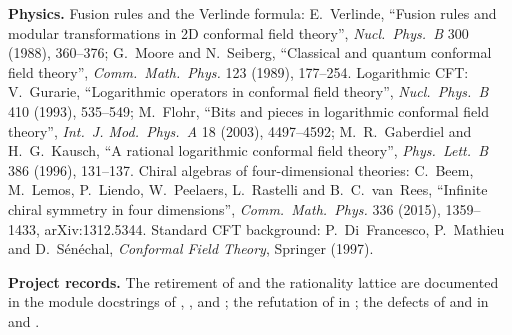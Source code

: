 \textbf{Physics.} Fusion rules and the Verlinde formula: E.~Verlinde, ``Fusion rules and modular transformations in 2D
conformal field theory'', \emph{Nucl.\ Phys.\ B} 300 (1988), 360--376; G.~Moore and N.~Seiberg, ``Classical and quantum
conformal field theory'', \emph{Comm.\ Math.\ Phys.} 123 (1989), 177--254. Logarithmic CFT: V.~Gurarie, ``Logarithmic operators
in conformal field theory'', \emph{Nucl.\ Phys.\ B} 410 (1993), 535--549; M.~Flohr, ``Bits and pieces in logarithmic conformal
field theory'', \emph{Int.\ J. Mod.\ Phys.\ A} 18 (2003), 4497--4592; M.~R.~Gaberdiel and H.~G.~Kausch, ``A rational logarithmic
conformal field theory'', \emph{Phys.\ Lett.\ B} 386 (1996), 131--137. Chiral algebras of four-dimensional theories:
C.~Beem, M.~Lemos, P.~Liendo, W.~Peelaers, L.~Rastelli and B.~C.~van~Rees, ``Infinite chiral symmetry in four dimensions'',
\emph{Comm.\ Math.\ Phys.} 336 (2015), 1359--1433, arXiv:1312.5344. Standard CFT background: P.~Di~Francesco, P.~Mathieu and
D.~S\'en\'echal, \emph{Conformal Field Theory}, Springer (1997).

\textbf{Project records.} The retirement of  and the rationality lattice are documented in the module
docstrings of , ,  and
; the refutation of  in
; the defects of  and  in
 and .

\endgroup
